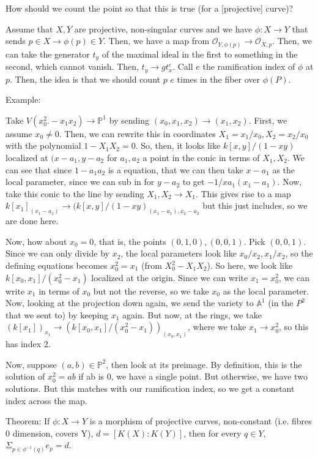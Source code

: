 \documentclass[10pt]{article}
\begin{document}
How should we count the point so that this is true (for a [projective] curve)?

Assume that $X,Y$ are projective, non-singular curves and we have $\phi: X \to Y$ that sends $p \in X \to \phi(p) \in Y$. Then, we have a map from $\mathcal{O}_{Y,\phi(p)} \to \mathcal{O}_{X,p}$. Then, we can take the generator $t_y$ of the maximal ideal in the first to something in the second, which cannot vanish. Then, $t_y \to g t_x^e$. Call $e$ the ramification index of $\phi$ at $p$. Then, the idea is that we should count $p$ $e$ times in the fiber over $\phi(P)$.

Example:

Take $V(x_0^2. -x_1x_2) \to \mathbb{P}^1$ by sending $(x_0,x_1,x_2) \to (x_1,x_2)$. First, we assume $x_0 \not = 0$. Then, we can rewrite this in coordinates $X_1 = x_1/x_0, X_2 = x_2/x_0$ with the polynomial $1 - X_1X_2 = 0$. So, then, it looks like $k[x,y]/(1-xy)$ localized at $(x - a_1, y - a_2$ for $a_1,a_2$ a point in the conic in terms of $X_1,X_2$.  We can see that since $1 - a_1a_2$ is a equation, that we can then take $x - a_1$ as the local parameter, since we can sub in for $y - a_2$ to get $-1/xa_1 (x_1 - a_1)$. Now, take this conic to the line by sending $X_1,X_2 \to X_1$. This gives rise to a map $k[x_1]_(x_1 - a_1) \to (k[x,y]/(1-xy)_{(x_1 - a_1), x_2 - a_2}$ but this just includes, so we are done here. 

Now, how about $x_0 = 0$, that is, the points $(0,1,0), (0,0,1)$. Pick $(0,0,1)$. Since we can only divide by $x_2$, the local parameters look like $x_0 /x_2, x_1/x_2$, so the defining equations becomes $x_0^2 = x_1$ (from $X_0^2 - X_1 X_2$). So here, we look like $k[x_0,x_1]/(x_0^2 - x_1)$ localized at the origin. Since we can write $x_1 = x_0^2$, we can write $x_1$ in terms of $x_0$ but not the reverse, so we take $x_0$ as the local parameter. Now, looking at the projection down again, we send the variety to $\mathbb{A}^1$ (in the $P^2$ that we sent to) by keeping $x_1$ again. But now, at the rings, we take $(k[x_1])_{x_1} \to (k[x_0,x_1]/(x_0^2 - x_1))_{(x_0,x_1)}$, where we take $x_1 \to x_0^2$, so this has index 2.

Now, suppose $(a,b) \in \mathbb{P}^2$, then look at its preimage. By definition, this is the solution of $x_0^2 = ab$ if ab is 0, we have a single point. But otherwise, we have two solutions. But this matches with our ramification index, so we get a constant index across the map. 

Theorem: If $\phi: X \to Y$ is a morphism of projective curves, non-constant (i.e. fibres 0 dimension, covers Y), $d = [ K(X) : K(Y) ]$, then for every $q \in Y$, $\Sigma_{p \in \phi^{-1}(q)} e_p = d$.
\end{document}
